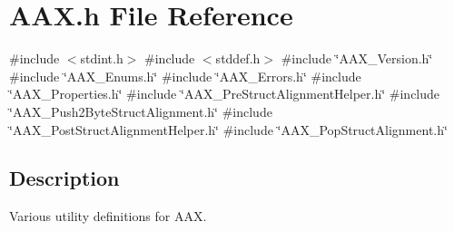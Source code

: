 \hypertarget{a00392}{}\section{A\+A\+X.\+h File Reference}
\label{a00392}
{\ttfamily \#include $<$stdint.\+h$>$}\newline
{\ttfamily \#include $<$stddef.\+h$>$}\newline
{\ttfamily \#include \char`\"{}A\+A\+X\+\_\+\+Version.\+h\char`\"{}}\newline
{\ttfamily \#include \char`\"{}A\+A\+X\+\_\+\+Enums.\+h\char`\"{}}\newline
{\ttfamily \#include \char`\"{}A\+A\+X\+\_\+\+Errors.\+h\char`\"{}}\newline
{\ttfamily \#include \char`\"{}A\+A\+X\+\_\+\+Properties.\+h\char`\"{}}\newline
{\ttfamily \#include \char`\"{}A\+A\+X\+\_\+\+Pre\+Struct\+Alignment\+Helper.\+h\char`\"{}}\newline
{\ttfamily \#include \char`\"{}A\+A\+X\+\_\+\+Push2\+Byte\+Struct\+Alignment.\+h\char`\"{}}\newline
{\ttfamily \#include \char`\"{}A\+A\+X\+\_\+\+Post\+Struct\+Alignment\+Helper.\+h\char`\"{}}\newline
{\ttfamily \#include \char`\"{}A\+A\+X\+\_\+\+Pop\+Struct\+Alignment.\+h\char`\"{}}\newline


\subsection{Description}
Various utility definitions for A\+AX. 

